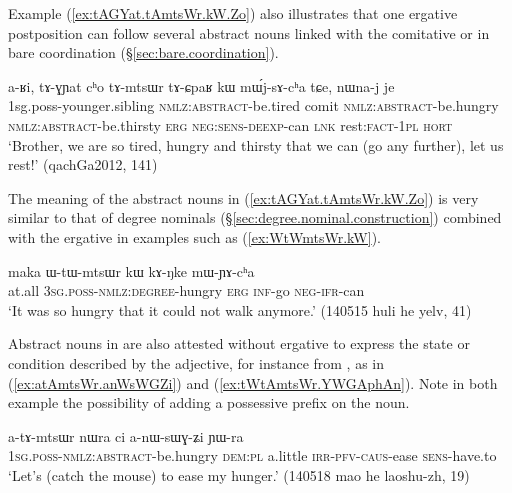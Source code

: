 Example (\ref{ex:tAGYat.tAmtsWr.kW.Zo}) also illustrates that one ergative postposition can follow several abstract nouns linked with the comitative  or in bare coordination (§\ref{sec:bare.coordination}). 

\begin{exe}
\ex \label{ex:tAGYat.tAmtsWr.kW.Zo}
\gll  a-ʁi, tɤ-ɣɲat cʰo tɤ-mtsɯr tɤ-ɕpaʁ kɯ mɯ́j-sɤ-cʰa tɕe, nɯna-j je \\
1sg.poss-younger.sibling \textsc{nmlz}:\textsc{abstract}-be.tired comit \textsc{nmlz}:\textsc{abstract}-be.hungry \textsc{nmlz}:\textsc{abstract}-be.thirsty \textsc{erg} \textsc{neg}:\textsc{sens}-\textsc{deexp}-can \textsc{lnk} rest:\textsc{fact}-\textsc{1pl} \textsc{hort} \\
\glt `Brother, we are so tired, hungry and thirsty that we can (go any further), let us rest!' (qachGa2012, 141)
\end{exe}

The meaning of the abstract nouns in (\ref{ex:tAGYat.tAmtsWr.kW.Zo}) is very similar to that of degree nominals (§\ref{sec:degree.nominal.construction}) combined with the ergative in examples such as (\ref{ex:WtWmtsWr.kW}).
 
\begin{exe}
\ex \label{ex:WtWmtsWr.kW}
\gll  maka ɯ-tɯ-mtsɯr kɯ kɤ-ŋke mɯ-ɲɤ-cʰa \\
at.all \textsc{3sg}.\textsc{poss}-\textsc{nmlz}:\textsc{degree}-hungry \textsc{erg} \textsc{inf}-go \textsc{neg}-\textsc{ifr}-can \\
\glt `It was so hungry that it could not walk anymore.'  (140515 huli he yelv, 41)
\end{exe}

Abstract nouns in  are also attested without ergative to express the state or condition described by the adjective, for instance  from , as in (\ref{ex:atAmtsWr.anWsWGZi}) and (\ref{ex:tWtAmtsWr.YWGAphAn}). Note in both example the possibility of adding a possessive prefix on the noun.

\begin{exe}
\ex \label{ex:atAmtsWr.anWsWGZi}
\gll  a-tɤ-mtsɯr nɯra ci a-nɯ-sɯɣ-ʑi ɲɯ-ra \\
\textsc{1sg}.\textsc{poss}-\textsc{nmlz}:\textsc{abstract}-be.hungry \textsc{dem}:\textsc{pl} a.little \textsc{irr}-\textsc{pfv}-\textsc{caus}-ease \textsc{sens}-have.to \\
\glt `Let's (catch the mouse) to ease my hunger.' (140518 mao he laoshu-zh, 19) 
\end{exe}

